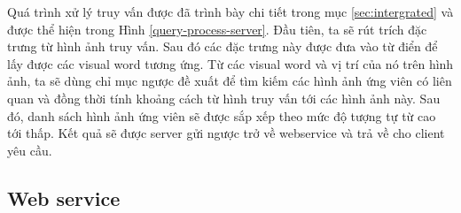 Quá trình xử lý truy vấn được đã trình bày chi tiết trong mục \ref{sec:intergrated} và được thể hiện trong Hình \ref{query-process-server}. Đầu tiên, ta sẽ rút trích đặc trưng từ hình ảnh truy vấn. Sau đó các đặc trưng này được đưa vào từ điển để lấy được các visual word tương ứng. Từ các visual word và vị trí của nó trên hình ảnh, ta sẽ dùng chỉ mục ngược đề xuất để tìm kiếm các hình ảnh ứng viên có liên quan và đồng thời tính khoảng cách từ hình truy vấn tới các hình ảnh này. Sau đó, danh sách hình ảnh ứng viên sẽ được sắp xếp theo mức độ tượng tự từ cao tới thấp. Kết quả sẽ được server gửi ngược trở về webservice và trả về cho client yêu cầu.

\subsection{Web service}
\label{subsection:web_service}
